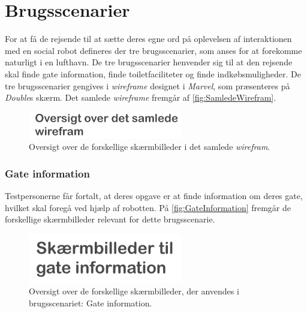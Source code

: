 \section{Brugsscenarier}
\label{ParametreBrugsscenarier}
%
For at få de rejsende til at sætte deres egne ord på oplevelsen af interaktionen med en social robot defineres der tre brugsscenarier, som anses for at forekomme naturligt i en lufthavn. De tre brugsscenarier henvender sig til at den rejsende skal finde gate information, finde toiletfaciliteter og finde indkøbsmuligheder. De tre brugsscenarier gengives i \textit{wireframe} designet i \textit{Marvel}, som præsenteres på \textit{Double}s skærm. Det samlede \textit{wireframe} fremgår af \autoref{fig:SamledeWirefram}.
%
\begin{figure}[H]
\centering
\includegraphics[width = 0.6\textwidth]{Figure/SamledeWirefram} 
\caption{Oversigt over de forskellige skærmbilleder i det samlede \textit{wirefram}.}
\label{fig:SamledeWirefram}
\end{figure}
\noindent
%  

\subsubsection*{Gate information}
%
Testpersonerne får fortalt, at deres opgave er at finde information om deres gate, hvilket skal foregå ved hjælp af robotten. På \autoref{fig:GateInformation} fremgår de forskellige skærmbilleder relevant for dette brugsscenarie. 
%
\begin{figure}[H]
\centering
\includegraphics[width = 0.6\textwidth]{Figure/GateInformation} 
\caption{Oversigt over de forskellige skærmbilleder, der anvendes i brugsscenariet: Gate information.}
\label{fig:GateInformation}
\end{figure}
\noindent
%  

